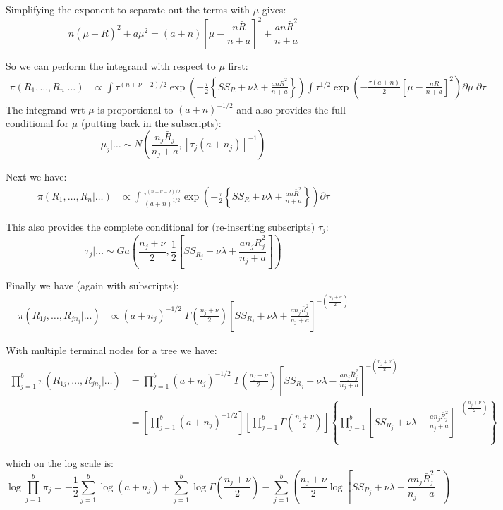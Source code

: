 \documentclass{article}
\begin{document}
Simplifying the exponent to separate out the terms with $\mu$ gives:
$$n(\mu - \bar{R})^2 + a \mu^2 = (a+n)\left[ \mu - \frac{n\bar{R}}{n + a} \right]^2 + \frac{a n\bar{R}^2}{n + a}$$

So we can perform the integrand with respect to $\mu$ first:
\begin{align*}
\pi(R_1, \ldots, R_n| \ldots ) &\propto  \int  \tau^{(n+\nu - 2)/2} \exp \left(-\frac{\tau}{2} \left\{ SS_{R} + \nu \lambda + \frac{an\bar{R}^2}{n + a} \right\} \right) \int \tau^{1/2} \exp \left(-\frac{\tau (a+n)}{2} \left[ \mu - \frac{n\bar{R}}{n + a} \right]^2  \right) \partial \mu \; \partial \tau
\end{align*}
The integrand wrt $\mu$ is proportional to $(a + n)^{-1/2}$ and also provides the full conditional for $\mu$ (putting back in the subscripts):
$$\mu_j |\ldots \sim N \left( \frac{n_j\bar{R}_j}{n_j + a} , \left[ \tau_j (a+n_j) \right]^{-1} \right)$$

Next we have: 
\begin{align*}
\pi(R_1, \ldots, R_n| \ldots ) &\propto  \int  \frac{\tau^{(n+\nu - 2)/2}}{(a+n)^{1/2}} \exp \left(-\frac{\tau}{2} \left\{ SS_{R} + \nu \lambda + \frac{an\bar{R}^2}{n + a} \right\} \right)  \partial \tau
\end{align*}

This also provides the complete conditional for (re-inserting subscripts) $\tau_j$:
$$\tau_j |\ldots \sim Ga \left( \frac{n_j + \nu}{2} , \frac{1}{2} \left[ SS_{R_j} + \nu \lambda + \frac{an_j\bar{R}_j^2}{n_j+a} \right] \right)$$

Finally we have (again with subscripts):
\begin{align*}
\pi(R_{1j}, \ldots, R_{jn_j}| \ldots ) &\propto (a+n_j)^{-1/2} \; \Gamma \left( \frac{n_j + \nu}{2} \right) \left[SS_{R_j} + \nu \lambda + \frac{an_j\bar{R}_j^2}{n_j + a} \right]^{-\left( \frac{n_j + \nu}{2} \right)}
\end{align*}

With multiple terminal nodes for a tree we have:
\begin{align*}
\prod_{j=1}^b \pi(R_{1j}, \ldots, R_{jn_j}| \ldots ) &= \prod_{j=1}^b (a+n_j)^{-1/2} \; \Gamma \left( \frac{n_j + \nu}{2} \right) \left[SS_{R_j} + \nu \lambda - \frac{an_j\bar{R}_j^2}{n_j + a} \right]^{-(\frac{n_j + \nu}{2})} \\
&= \left[ \prod_{j=1}^b (a+n_j)^{-1/2} \right] \left[ \prod_{j=1}^b \Gamma \left( \frac{n_j + \nu}{2} \right) \right] \left\{ \prod_{j=1}^b \left[SS_{R_j} + \nu \lambda + \frac{an_j\bar{R}_j^2}{n_j + a} \right]^{-\left( \frac{n_j + \nu}{2} \right)} \right\}
\end{align*}

which on the log scale is:
$$\log \prod_{j=1}^b \pi_j = -\frac{1}{2} \sum_{j=1}^b \log(a + n_j) + \sum_{j=1}^b \log \Gamma \left( \frac{n_j + \nu}{2} \right) - \sum_{j=1}^b \left( \frac{n_j + \nu}{2} \log \left[SS_{R_j} + \nu \lambda + \frac{an_j\bar{R}_j^2}{n_j + a} \right] \right) $$
\end{document}
